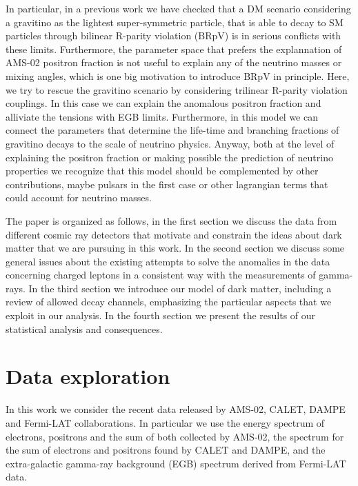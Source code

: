 \documentclass[a4paper,11pt]{article}
\begin{document}
In particular, in a previous work we have checked that a DM scenario considering a gravitino as the lightest super-symmetric particle, that is able to decay to SM particles through bilinear R-parity violation (BRpV) is in serious conflicts with these limits. Furthermore, the parameter space that prefers the explannation of AMS-02 positron fraction is not useful to explain any of the neutrino masses or mixing angles, which is one big motivation to introduce BRpV in principle. Here, we try to rescue the gravitino scenario by considering trilinear R-parity violation couplings. In this case we can explain the anomalous positron fraction and alliviate the tensions with EGB limits. Furthermore, in this model we can connect the parameters that determine the life-time and branching fractions of gravitino decays to the scale of neutrino physics. Anyway, both at the level of explaining the 
positron fraction or making possible the prediction of neutrino properties we recognize that this model should be complemented by other contributions, maybe pulsars in the first case or other lagrangian terms that could account for neutrino masses.

The paper is organized as follows, in the first section we discuss the data from different cosmic ray detectors that motivate and constrain the ideas about dark matter that we are pursuing in this work. In the second section we discuss some general issues about the existing attempts
to solve the anomalies in the data concerning charged leptons in a consistent way with the measurements of gamma-rays. In the third section we introduce our model of dark matter, including a review of allowed decay channels, emphasizing the particular aspects that we exploit in our analysis. In the fourth section we present the results of our statistical analysis and consequences.


\section{Data exploration}

In this work we consider the recent data released by AMS-02, CALET, DAMPE and Fermi-LAT collaborations. In particular we use the energy spectrum of electrons, positrons and the sum of both collected by AMS-02, the spectrum for the sum of electrons and positrons found by CALET and DAMPE, and the extra-galactic gamma-ray background (EGB) spectrum derived from Fermi-LAT data.


\end{document}
